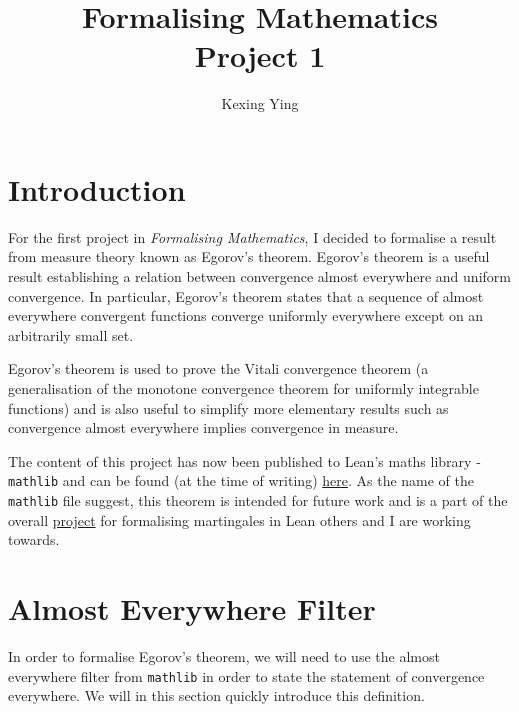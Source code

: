 \documentclass[]{article}
\title{Formalising Mathematics\\
  \large Project 1}
\author{Kexing Ying}
\theoremstyle{definition}
\begin{document}
\maketitle

\section*{Introduction}

For the first project in \textit{Formalising Mathematics}, I decided to formalise a result from 
measure theory known as Egorov's theorem. Egorov's theorem is a useful result establishing a 
relation between convergence almost everywhere and uniform convergence. In particular, 
Egorov's theorem states that a sequence of almost everywhere convergent functions 
converge uniformly everywhere except on an arbitrarily small set.

Egorov's theorem is used to prove the Vitali convergence theorem 
(a generalisation of the monotone convergence theorem for uniformly integrable functions)
and is also useful to simplify more elementary results such as convergence almost 
everywhere implies convergence in measure. 

The content of this project has now been published to Lean's maths library - 
\texttt{mathlib} and can be found (at the time of writing) 
\href{https://github.com/leanprover-community/mathlib/blob/master/src/measure_theory/function/uniform_integrable.lean}{here}.
As the name of the \texttt{mathlib} file suggest, this theorem is intended for future 
work and is a part of the overall 
\href{https://github.com/leanprover-community/mathlib/projects/15}{project} 
for formalising martingales in Lean others and I are working towards. 


\section*{Almost Everywhere Filter}

In order to formalise Egorov's theorem, we will need to use the almost everywhere 
filter from \texttt{mathlib} in order to state the statement of convergence everywhere. 
We will in this section quickly introduce this definition. 
\end{document}
